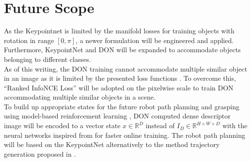 \chapter{Future Scope}
As the Keypointnet is limited by the manifold losses for training objects with rotation in range $[0, \pi]$, a newer formulation will be engineered and applied.
Furthermore, KeypointNet and \ac{DON} will be expanded to accommodate objects belonging to different classes.\\

As of this writing, the \ac{DON} training cannot accommodate multiple similar object in an image as it is limited by the presented loss functions \parencites{florence2020dense}{adrian2022efficient}.
To overcome this, ``Ranked InfoNCE Loss'' \cite{hoffmann2022ranking} will be adopted on the pixelwise scale to train \ac{DON} accommodating multiple similar
objects in a scene.\\

To build up appropriate states for the future robot path planning and grasping using model-based reinforcement learning \cite{kaiser2019model},
\ac{DON} computed dense descriptor image will be encoded to a vector
state $x \in \mathbb{R}^D$ instead of $I_D \in \mathbb{R}^{H \times W \times D}$ with the neural networks inspired from \cite{tschannen2018recent} for faster online training.
The robot path planning will be based on the KeypointNet alternatively to the method trajectory generation proposed in \parencites{florence2019self}.